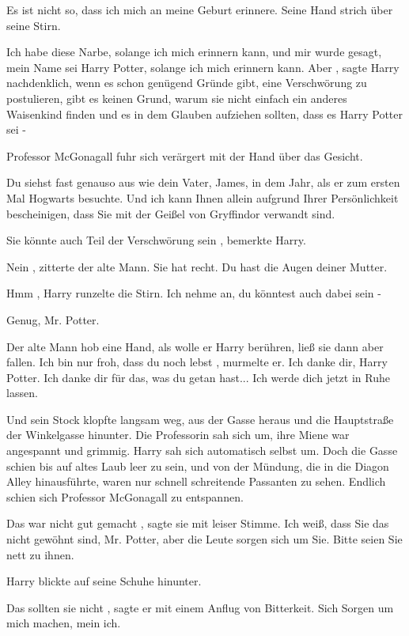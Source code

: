 \glqq Es ist nicht so, dass ich mich an meine Geburt erinnere.\grqq{}
Seine Hand strich über seine Stirn.

\glqq Ich habe diese Narbe, solange ich mich erinnern kann, und mir wurde gesagt, mein Name sei Harry Potter,
solange ich mich erinnern kann. Aber\grqq{} ,
sagte Harry nachdenklich,
\glqq wenn es schon genügend Gründe
gibt, eine Verschwörung zu postulieren, gibt es keinen Grund, warum sie nicht einfach ein anderes Waisenkind finden und
es in dem Glauben aufziehen sollten, dass es Harry Potter sei -\grqq{}

Professor McGonagall fuhr sich
verärgert mit der Hand über das Gesicht.

\glqq Du siehst fast genauso aus wie dein Vater, James, in dem
Jahr, als er zum ersten Mal Hogwarts besuchte. Und ich kann Ihnen allein aufgrund Ihrer Persönlichkeit bescheinigen,
dass Sie mit der Geißel von Gryffindor verwandt sind.\grqq{}

\glqq Sie könnte auch Teil der Verschwörung
sein\grqq{} , bemerkte Harry.

\glqq Nein\grqq{} , zitterte der alte Mann. \glqq Sie hat recht. Du hast die Augen
deiner Mutter.\grqq{}

\glqq Hmm\grqq{} , Harry runzelte die Stirn. \glqq Ich nehme an, du könntest auch dabei
sein -\grqq{}

\glqq Genug, Mr. Potter.\grqq{}

Der alte Mann hob eine Hand, als wolle er Harry
berühren, ließ sie dann aber fallen. \glqq Ich bin nur froh, dass du noch lebst\grqq{} , murmelte er.
\glqq Ich
danke dir, Harry Potter. Ich danke dir für das, was du getan hast... Ich werde dich jetzt in Ruhe lassen.\grqq{}

Und sein Stock klopfte langsam weg, aus der Gasse heraus und die Hauptstraße der Winkelgasse hinunter. Die
Professorin sah sich um, ihre Miene war angespannt und grimmig. Harry sah sich automatisch selbst um. Doch die Gasse
schien bis auf altes Laub leer zu sein, und von der Mündung, die in die Diagon Alley hinausführte, waren nur schnell
schreitende Passanten zu sehen.
Endlich schien sich Professor McGonagall zu entspannen.

\glqq Das war
nicht gut gemacht\grqq{} , sagte sie mit leiser Stimme. \glqq Ich weiß, dass Sie das nicht gewöhnt sind, Mr. Potter, aber
die Leute sorgen sich um Sie. Bitte seien Sie nett zu ihnen.\grqq{}

Harry blickte auf seine Schuhe hinunter.

\glqq Das sollten sie nicht\grqq{} , sagte er mit einem Anflug von Bitterkeit. \glqq Sich Sorgen um mich
machen, mein ich.\grqq{}

